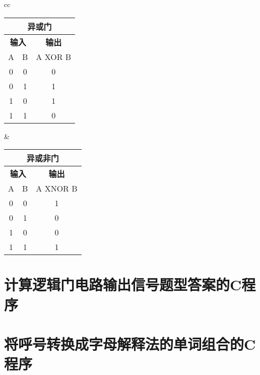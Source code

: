 \begin{tabular}{cc}%
  \begin{tabular}{|c|c|c|}
    \multicolumn{3}{c}{\textbf{异或门}}                          \\
    \hline
    \multicolumn{2}{|c|}{\textbf{输入}} & \textbf{输出}           \\
    \hline
    A                                 & B           & A XOR B \\
    \hline
    \num{0}                           & \num{0}     & \num{0} \\
    \hline
    \num{0}                           & \num{1}     & \num{1} \\
    \hline
    \num{1}                           & \num{0}     & \num{1} \\
    \hline
    \num{1}                           & \num{1}     & \num{0} \\
    \hline
  \end{tabular} &
  \begin{tabular}{|c|c|c|}
    \multicolumn{3}{c}{\textbf{异或非门}}                          \\
    \hline
    \multicolumn{2}{|c|}{\textbf{输入}} & \textbf{输出}            \\
    \hline
    A                                 & B           & A XNOR B \\
    \hline
    \num{0}                           & \num{0}     & \num{1}  \\
    \hline
    \num{0}                           & \num{1}     & \num{0}  \\
    \hline
    \num{1}                           & \num{0}     & \num{0}  \\
    \hline
    \num{1}                           & \num{1}     & \num{1}  \\
    \hline
  \end{tabular} \tabularnewline
\end{tabular}

\newpage

\section{计算逻辑门电路输出信号题型答案的C程序}



\newpage

\section{将呼号转换成字母解释法的单词组合的C程序}

